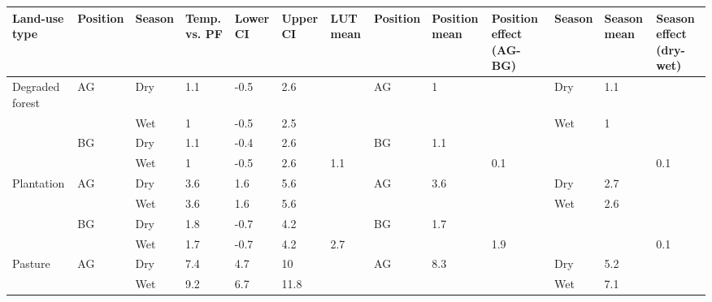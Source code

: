 \documentclass[12pt,a4paper,]{report}
\theoremstyle{definition}
\theoremstyle{definition}
\theoremstyle{definition}
\theoremstyle{remark}
\begin{document}
\begin{table}
\renewcommand{\arraystretch}{1.1} %
\setlength{\tabcolsep}{5pt} %
\begin{center}
\begin{tabular}{p{3cm}p{1.3cm}p{1.3cm}p{1.3cm}p{1.3cm}p{1.3cm}p{1.3cm}p{1.3cm}p{1.3cm}p{1.5cm}p{1.3cm}p{1.3cm}p{1.5cm}}\toprule
    \bfseries Land-use type & \bfseries Position & \bfseries Season & \bfseries Temp. vs. PF & \bfseries Lower CI & \bfseries Upper CI & \bfseries LUT mean & \bfseries Position & \bfseries Position mean & \bfseries Position effect (AG-BG) & \bfseries Season & \bfseries Season mean & \bfseries Season effect (dry-wet) \\
    \hline
    Degraded forest & AG & Dry & 1.1 & -0.5 & 2.6 &                     & AG & 1   &                      & Dry & 1.1 &                      \\
                    &    & Wet & 1   & -0.5 & 2.5 &                     &    &     &                      & Wet & 1   &                      \\
                    & BG & Dry & 1.1 & -0.4 & 2.6 &                     & BG & 1.1 &                      &     &     &                      \\
                    &    & Wet & 1   & -0.5 & 2.6 &\multirow{-4}{*}{1.1}&    &     &\multirow{-4}{*}{0.1} &     &     &\multirow{-4}{*}{0.1} \\\rowcolor{lightgrey}
    Plantation      & AG & Dry & 3.6 & 1.6  & 5.6 &                     & AG & 3.6 &                      & Dry & 2.7 &                      \\\rowcolor{lightgrey}
                    &    & Wet & 3.6 & 1.6  & 5.6 &                     &    &     &                      & Wet & 2.6 &                      \\\rowcolor{lightgrey}
                    & BG & Dry & 1.8 & -0.7 & 4.2 &                     & BG & 1.7 &                      &     &     &                      \\\rowcolor{lightgrey}
                    &    & Wet & 1.7 & -0.7 & 4.2 &\multirow{-4}{*}{2.7}&    &     &\multirow{-4}{*}{1.9} &     &     &\multirow{-4}{*}{0.1} \\
    Pasture         & AG & Dry & 7.4 & 4.7  & 10  &                     & AG & 8.3 &                      & Dry & 5.2 &                      \\
                    &    & Wet & 9.2 & 6.7  & 11.8&                     &    &     &                      & Wet & 7.1 &                      \\

\end{tabular}
\end{center}
\end{table}
\end{document}
